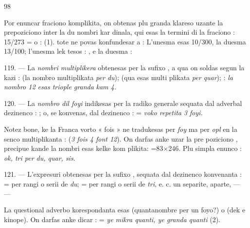 \begin{VUpage}[102]{98}

Por enuncar fraciono komplikita, on obtenas plu granda\nl
klareso uzante la prepoziciono  inter la du nombri kar\cc
dinala, qui esas la termini di la fraciono : 15/273 = \nl
{} o :  (1).\nl
{} tote ne povas konfundesar a : \cc
{} L'unesma esas 10/300, la duesma 13/100; l'unesma lek\cc
tesos : , e la duesma : 

\VUblanc{4.94pt}%
119. --- La \textit{nombri multiplikera} obtenesas per la sufixo\nl
{}, a qua on soldas  segun la kazi :  (la\nl
nombro multiplikata \textit{per du});  (qua esas multi\cc
plikata \textit{per quar});  : \textit{la nombro 12 esas triople granda}\nl
\textit{kam 4.}

\VUblanc{6.02pt}%
120. --- La \textit{nombro dil foyi} indikesas per la radiko \nl
generale sequata dal adverbal dezinenco  : ; o, se\nl
konvenas, dal dezinenco  :  = \textit{voko repetita}\nl
\textit{3 foyi.}

Notez bone, ke la Franca vorto « fois » ne tradukesas\nl
per \textit{foy} ma per \textit{opl} en la senco multiplikanta : \nl
{} (\textit{3 fois 4 font 12}). On darfas anke uzar la pre\cc
poziciono , precipue kande la nombri esas kelke kom\cc
plikita: =83×246.\nl
Plu simpla enunco : \textit{ok, tri per du, quar, sis}.

\VUblanc{5.71pt}%
121. --- L'expresuri  obtenesas per la sufixo\nl
{}, sequata dal dezinenco konvenanta :  = per rangi\nl
o serii de \textit{du};  = per rangi o serii de \textit{tri}, e. c. \nl
un separite, aparte,  ---\nl
{}\nl
{} --- 

La questional adverbo korespondanta esas \nl
{} (quantanombre per un foyo?)\nl
{} o  (dek e kinope). On darfas anke dicar :\nl
{} = \textit{ye mikra quanti, ye granda quanti} (2).\parplein
\end{VUpage}

